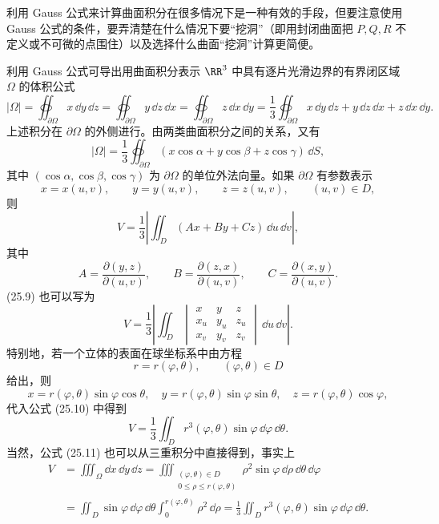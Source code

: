 \begin{xremark}
利用 Gauss 公式来计算曲面积分在很多情况下是一种有效的手段，但要注意使用 Gauss 公式的条件，要弄清楚在什么情况下要“挖洞”（即用封闭曲面把 $P,Q,R$ 不定义或不可微的点围住）以及选择什么曲面“挖洞”计算更简便。
\end{xremark}

利用 Gauss 公式可导出用曲面积分表示 $\RR^3$ 中具有逐片光滑边界的有界闭区域 $\Omega$ 的体积公式
\begin{equation}
  |\Omega|=\oiint_{\partial\Omega}x\,\dd y\,\dd z
  =\oiint_{\partial\Omega}y\,\dd z\,\dd x
  =\oiint_{\partial\Omega}z\,\dd x\,\dd y
  =\frac13\oiint_{\partial\Omega}x\,\dd y\,\dd z+y\,\dd z\,\dd x+z\,\dd x\,\dd y.
  \tag{25.7}
\end{equation}
上述积分在 $\partial\Omega$ 的外侧进行。由两类曲面积分之间的关系，又有
\begin{equation}
  |\Omega|=\frac13\oiint_{\partial\Omega}(x\cos\alpha+y\cos\beta+z\cos\gamma)\,\dd S,
  \tag{25.8}
\end{equation}
其中 $(\cos\alpha,\cos\beta,\cos\gamma)$ 为 $\partial\Omega$ 的单位外法向量。如果 $\partial\Omega$ 有参数表示
\[
  x=x(u,v),\qquad y=y(u,v),\qquad z=z(u,v),\qquad (u,v)\in D,
\]
则
\begin{equation}
  V=\frac13\left|\iint_D(Ax+By+Cz)\,\dd u\,\dd v\right|,
  \tag{25.9}
\end{equation}
其中
\[
  A=\frac{\partial(y,z)}{\partial(u,v)},\qquad
  B=\frac{\partial(z,x)}{\partial(u,v)},\qquad
  C=\frac{\partial(x,y)}{\partial(u,v)}.
\]
(25.9) 也可以写为
\begin{equation}
  V=\frac13\left|\iint_D
  \begin{vmatrix}
  x&y&z\\x_u&y_u&z_u\\x_v&y_v&z_v
  \end{vmatrix}\,\dd u\,\dd v\right|.
  \tag{25.10}
\end{equation}
特别地，若一个立体的表面在球坐标系中由方程
\[
  r=r(\varphi,\theta),\qquad(\varphi,\theta)\in D
\]
给出，则
\[
  x=r(\varphi,\theta)\sin\varphi\cos\theta,\quad
  y=r(\varphi,\theta)\sin\varphi\sin\theta,\quad
  z=r(\varphi,\theta)\cos\varphi,
\]
代入公式 (25.10) 中得到
\begin{equation}
  V=\frac13\iint_D r^3(\varphi,\theta)\sin\varphi\,\dd\varphi\,\dd\theta.
  \tag{25.11}
\end{equation}
当然，公式 (25.11) 也可以从三重积分中直接得到，事实上
\begin{align*}
V&=\iiint_\Omega\dd x\,\dd y\,\dd z
=\iiint_{\substack{(\varphi,\theta)\in D\\0\le\rho\le r(\varphi,\theta)}}
\rho^2\sin\varphi\,\dd\rho\,\dd\theta\,\dd\varphi\\
&=\iint_D\sin\varphi\,\dd\varphi\,\dd\theta
\int_0^{r(\varphi,\theta)}\rho^2\,\dd\rho
=\frac13\iint_Dr^3(\varphi,\theta)\sin\varphi\,\dd\varphi\,\dd\theta.
\end{align*}

